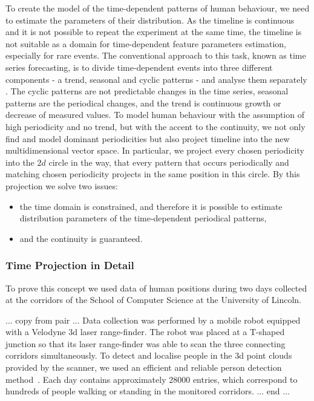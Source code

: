 To create the model of the time-dependent patterns of human behaviour, we need to estimate the parameters of their distribution.
As the timeline is continuous and it is not possible to repeat the experiment at the same time, the timeline is not suitable as a domain for time-dependent feature parameters estimation, especially for rare events.
The conventional approach to this task, known as time series forecasting, is to divide time-dependent events into three different components - a trend, seasonal and cyclic patterns - and analyse them separately \cite{gould2008forecasting}.
The cyclic patterns are not predictable changes in the time series, seasonal patterns are the periodical changes, and the trend is continuous growth or decrease of measured values.
To model human behaviour with the assumption of high periodicity and no trend, but with the accent to the continuity, we not only find and model dominant periodicities but also project timeline into the new multidimensional vector space.
In particular, we project every chosen periodicity into the $2d$ circle in the way, that every pattern that occurs periodically and matching chosen periodicity projects in the same position in this circle.
By this projection we solve two issues:
\begin{itemize}
    \item the time domain is constrained, and therefore it is possible to estimate distribution parameters of the time-dependent periodical patterns,
    \item and the continuity is guaranteed.
\end{itemize}

\subsubsection{Time Projection in Detail}

To prove this concept we used data of human positions during two days collected at the corridors of the School of Computer Science at the University of Lincoln.

... copy from pair ...
Data collection was performed by a mobile robot equipped with a Velodyne 3d laser range-finder.
The robot was placed at a T-shaped junction so that its laser range-finder was able to scan the three connecting corridors simultaneously.
To detect and localise people in the 3d point clouds provided by the scanner, we used an efficient and reliable person detection method~\cite{yan2017online}.
Each day contains approximately $28000$ entries, which correspond to hundreds of people walking or standing in the monitored corridors.
... end ...

